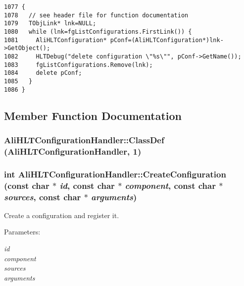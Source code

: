 \footnotesize\begin{verbatim}1077 {
1078   // see header file for function documentation
1079   TObjLink* lnk=NULL;
1080   while (lnk=fgListConfigurations.FirstLink()) {
1081     AliHLTConfiguration* pConf=(AliHLTConfiguration*)lnk->GetObject();
1082     HLTDebug("delete configuration \"%s\"", pConf->GetName());
1083     fgListConfigurations.Remove(lnk);
1084     delete pConf;
1085   }
1086 }
\end{verbatim}\normalsize 




\subsection{Member Function Documentation}
\subsubsection{\setlength{\rightskip}{0pt plus 5cm}Ali\-HLTConfiguration\-Handler::Class\-Def ({\bf Ali\-HLTConfiguration\-Handler}, 1)\hspace{0.3cm}{\tt  [private]}}\label{classAliHLTConfigurationHandler_d0}


\subsubsection{\setlength{\rightskip}{0pt plus 5cm}int Ali\-HLTConfiguration\-Handler::Create\-Configuration (const char $\ast$ {\em id}, const char $\ast$ {\em component}, const char $\ast$ {\em sources}, const char $\ast$ {\em arguments})}\label{classAliHLTConfigurationHandler_a3}


Create a configuration and register it. \begin{Desc}
\item[Parameters:]
\begin{description}
\item[{\em id}]\item[{\em component}]\item[{\em sources}]\item[{\em arguments}]\end{description}
\end{Desc}



